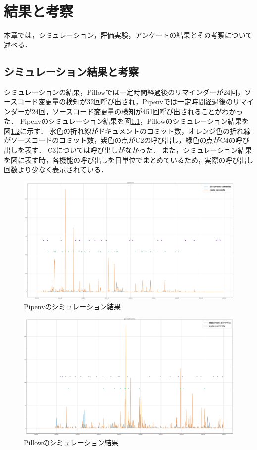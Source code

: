 \chapter{結果と考察}
本章では，シミュレーション，評価実験，アンケートの結果とその考察について述べる．

\section{シミュレーション結果と考察}
シミュレーションの結果，Pillowでは一定時間経過後のリマインダーが24回，ソースコード変更量の検知が32回呼び出され，Pipenvでは一定時間経過後のリマインダーが24回，ソースコード変更量の検知が451回呼び出されることがわかった．
Pipenvのシミュレーション結果を図\ref{sim1}，Pillowのシミュレーション結果を図\ref{sim2}に示す．
水色の折れ線がドキュメントのコミット数，オレンジ色の折れ線がソースコードのコミット数，紫色の点がC2の呼び出し，緑色の点がC4の呼び出しを表す．
C3については呼び出しがなかった．
また，シミュレーション結果を図に表す時，各機能の呼び出しを日単位でまとめているため，実際の呼び出し回数より少なく表示されている．

\begin{figure}[H]
    \centering
    \includegraphics[width=14cm]{images/sim1.png}
    \caption{Pipenvのシミュレーション結果}
    \label{sim1}
\end{figure}

\begin{figure}[H]
    \centering
    \includegraphics[width=14cm]{images/sim2.png}
    \caption{Pillowのシミュレーション結果}
    \label{sim2}
\end{figure}

